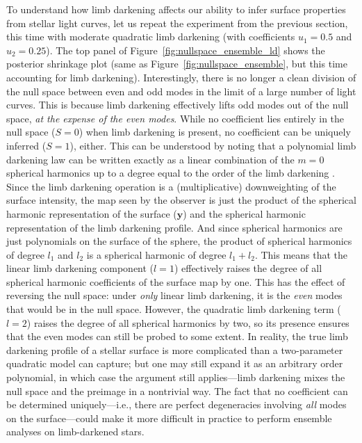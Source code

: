 \documentclass[modern]{aastex62}
\begin{document}
To understand how limb darkening affects our ability to infer
surface properties from stellar light curves,
let us repeat the experiment from the previous section,
this time with moderate quadratic limb darkening (with coefficients
$u_1 = 0.5$ and $u_2 = 0.25$).
The top panel of Figure~\ref{fig:nullspace_ensemble_ld} shows the
posterior shrinkage plot (same as Figure~\ref{fig:nullspace_ensemble}, but
this time accounting for limb darkening). Interestingly, there is no longer a clean division of
the null space between even and odd modes in the limit of a large number
of light curves.
This is because limb darkening effectively lifts odd modes out of the null space, \emph{at the
    expense of the even modes}. While no coefficient lies entirely in the
null space ($S = 0$) when limb darkening is present, no coefficient
can be uniquely inferred ($S = 1$), either. This can be understood by noting that
a polynomial limb darkening law can be written
exactly as a linear combination of the $m=0$ spherical harmonics
up to a degree equal to the order of the limb darkening
\citep[in this case, $l = 2$;]{Luger2019,Agol2020}.
Since the limb darkening operation is a (multiplicative) downweighting of
the surface intensity, the map seen by the observer is just the product
of the spherical harmonic representation of the surface ($\mathbf{y}$)
and the spherical harmonic representation of the limb darkening profile.
And since spherical harmonics are just polynomials on the surface of the sphere,
the product of spherical harmonics of degree $l_1$ and $l_2$ is a spherical
harmonic of degree $l_1 + l_2$. This means that the linear limb darkening
component ($l = 1$) effectively raises the degree of all spherical harmonic
coefficients of the surface map by one. This has the effect of reversing
the null space: under \emph{only} linear limb darkening, it is the \emph{even}
modes that would be in the null space. However, the quadratic
limb darkening term ($l = 2$) raises the degree of all spherical harmonics by two,
so its presence ensures that the even modes can still be probed to some extent.
In reality, the true limb darkening profile of a stellar surface is more
complicated than a two-parameter quadratic model can capture; but one may still
expand it as an arbitrary order polynomial, in which case the argument still
applies---limb darkening mixes the null space and the preimage in a nontrivial
way.
%
The fact that no coefficient can be determined uniquely---i.e., there are
perfect degeneracies involving \emph{all} modes on the surface---could make it more
difficult in practice to perform ensemble analyses on limb-darkened stars.
\end{document}
